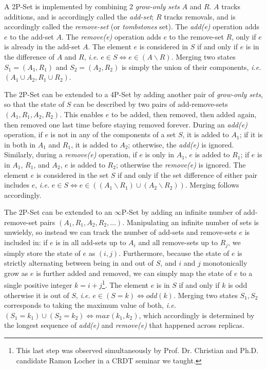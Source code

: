 \documentclass[11pt, oneside]{article}   	%
\begin{document}
A 2P-Set is implemented by combining 2 \textit{grow-only sets} $A$ and $R$. $A$ tracks additions, and is accordingly called the \textit{add-set}; $R$ tracks removals, and is accordingly called the \textit{remove-set} (or \textit{tombstones} set). The \textit{add(e)} operation adds $e$ to the add-set $A$. The \textit{remove(e)} operation adds $e$ to the remove-set $R$, only if $e$ is already in the add-set $A$. The element $e$ is considered in $S$ if and only if $e$ is in the difference of $A$ and $R$, \textit{i.e.} $e \in S \Leftrightarrow e \in (A\backslash R)$. Merging two states $S_1 = (A_1, R_1)$ and $S_2 = (A_2, R_2)$ is simply the union of their components, \textit{i.e.} $(A_1 \cup A_2, R_1 \cup R_2)$.

The 2P-Set can be extended to a 4P-Set by adding another pair of \textit{grow-only sets}, so that the state of $S$ can be described by two pairs of add-remove-sets $(A_1,R_1,A_2,R_2)$.  This enables $e$ to be added, then removed, then added again, then removed one last time before staying removed forever. During an \textit{add(e)} operation, if $e$ is not in any of the components of a set $S$, it is added to $A_1$; if it is in both in $A_1$ and $R_1$, it is added to $A_2$; otherwise, the \textit{add(e)} is ignored. Similarly, during a \textit{remove(e)} operation, if $e$ is only in $A_1$, $e$ is added to $R_1$; if $e$ is in $A_1$, $R_1$, and $A_2$, $e$ is added to $R_2$; otherwise the \textit{remove(e)} is ignored. The element $e$ is considered in the set $S$ if and only if the set difference of either pair includes $e$, \textit{i.e.} $e \in S \Leftrightarrow e \in  ((A_1 \backslash R_1) \cup (A_2 \backslash R_2))$. Merging follows accordingly.

The 2P-Set can be extended to an $\infty$P-Set by adding an infinite number of add-remove-set pairs $(A_1, R_1, A_2, R_2, \dots)$. Manipulating an infinite number of sets is unwieldy, so instead we can track the number of add-sets and remove-sets 
$e$ is included in: if $e$ is in all add-sets up to $A_i$ and all remove-sets up to $R_{j}$, we simply store the state of $e$ as $(i, j)$. Furthermore, because the state of $e$ is strictly alternating between being in and out of $S$, and $i$ and $j$ monotonically grow as $e$ is further added and removed, we can simply map the state of $e$ to a single positive integer $k=i+j$\footnote{This last step was observed simultaneously by Prof. Dr. Christian and Ph.D. candidate Ramon Locher in a CRDT seminar we taught.}. The element $e$ is in $S$ if and only if $k$ is odd otherwise it is out of $S$, \textit{i.e.} $e \in (S=k) \Leftrightarrow odd(k)$. Merging two states $S_1, S_2$ corresponds to taking the maximum value of both, \textit{i.e.} $(S_1=k_1) \cup (S_2=k_2) \Leftrightarrow max(k_1, k_2)$, which accordingly is determined by the longest sequence of \textit{add(e)} and \textit{remove(e)} that happened across replicas. 
\end{document}
